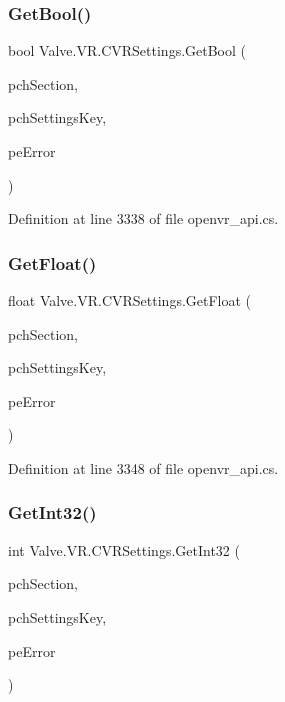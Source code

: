 \subsubsection{\texorpdfstring{GetBool()}{GetBool()}}
{\footnotesize\ttfamily bool Valve.\+V\+R.\+C\+V\+R\+Settings.\+Get\+Bool (\begin{DoxyParamCaption}\item[{string}]{pch\+Section,  }\item[{string}]{pch\+Settings\+Key,  }\item[{ref \mbox{\hyperlink{namespace_valve_1_1_v_r_aeab7722b211afc3885ed77faa931291f}{E\+V\+R\+Settings\+Error}}}]{pe\+Error }\end{DoxyParamCaption})}



Definition at line 3338 of file openvr\+\_\+api.\+cs.

\mbox{\label{class_valve_1_1_v_r_1_1_c_v_r_settings_a8537b41839f28189017706e73163a2cc}} 
\subsubsection{\texorpdfstring{GetFloat()}{GetFloat()}}
{\footnotesize\ttfamily float Valve.\+V\+R.\+C\+V\+R\+Settings.\+Get\+Float (\begin{DoxyParamCaption}\item[{string}]{pch\+Section,  }\item[{string}]{pch\+Settings\+Key,  }\item[{ref \mbox{\hyperlink{namespace_valve_1_1_v_r_aeab7722b211afc3885ed77faa931291f}{E\+V\+R\+Settings\+Error}}}]{pe\+Error }\end{DoxyParamCaption})}



Definition at line 3348 of file openvr\+\_\+api.\+cs.

\mbox{\label{class_valve_1_1_v_r_1_1_c_v_r_settings_ae2d7aa36ff2a62584ceacdf868162a3e}} 
\subsubsection{\texorpdfstring{GetInt32()}{GetInt32()}}
{\footnotesize\ttfamily int Valve.\+V\+R.\+C\+V\+R\+Settings.\+Get\+Int32 (\begin{DoxyParamCaption}\item[{string}]{pch\+Section,  }\item[{string}]{pch\+Settings\+Key,  }\item[{ref \mbox{\hyperlink{namespace_valve_1_1_v_r_aeab7722b211afc3885ed77faa931291f}{E\+V\+R\+Settings\+Error}}}]{pe\+Error }\end{DoxyParamCaption})}



